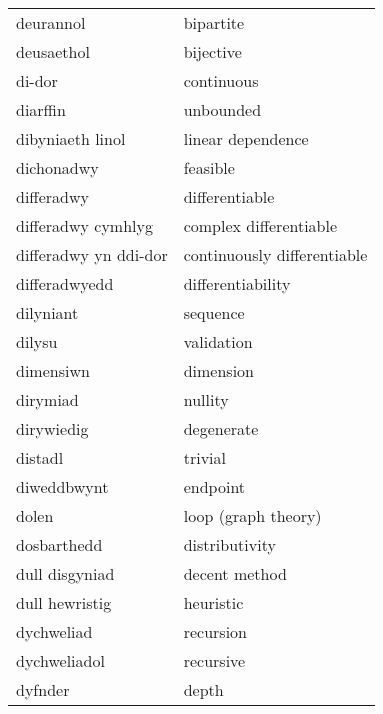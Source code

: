 \begin{supertabular}{p{0.22\textwidth}p{0.22\textwidth}}
                       deurannol &                         bipartite \\
                      deusaethol &                         bijective \\
                          di-dor &                        continuous \\
                        diarffin &                         unbounded \\
                dibyniaeth linol &                 linear dependence \\
                      dichonadwy &                          feasible \\
                      differadwy &                    differentiable \\
              differadwy cymhlyg &            complex differentiable \\
           differadwy yn ddi-dor &       continuously differentiable \\
                   differadwyedd &                 differentiability \\
                       dilyniant &                          sequence \\
                          dilysu &                        validation \\
                       dimensiwn &                         dimension \\
                        dirymiad &                           nullity \\
                      dirywiedig &                        degenerate \\
                         distadl &                           trivial \\
                     diweddbwynt &                          endpoint \\
                           dolen &               loop (graph theory) \\
                     dosbarthedd &                    distributivity \\
                  dull disgyniad &                     decent method \\
                  dull hewristig &                         heuristic \\
                      dychweliad &                         recursion \\
                    dychweliadol &                         recursive \\
                         dyfnder &                             depth \\

\end{supertabular}
